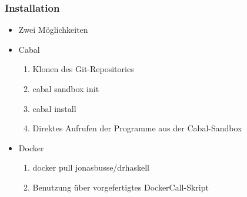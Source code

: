 \begin{frame}
	\frametitle{Installation}
	\begin{itemize}
		\item{Zwei Möglichkeiten} \pause
		\item{Cabal}
			\begin{enumerate}
				\item{Klonen des Git-Repositories}
				\item{cabal sandbox init}
				\item{cabal install}
				\item{Direktes Aufrufen der Programme aus der Cabal-Sandbox}
			\end{enumerate}
			\pause
		\item{Docker}
			\begin{enumerate}
				\item{docker pull jonasbusse/drhaskell}
				\item{Benutzung über vorgefertigtes DockerCall-Skript}
			\end{enumerate}
	\end{itemize}
\end{frame}